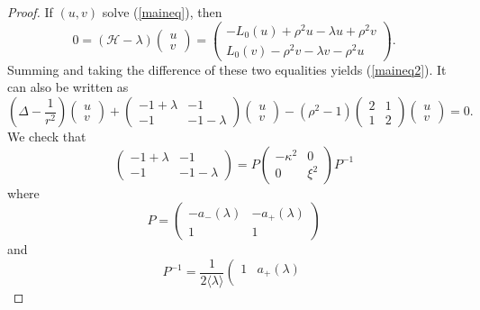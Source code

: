 \documentclass[11 pt]{amsart}
\theoremstyle{definition}
\theoremstyle{remark}
\numberwithin{equation}{section}
\begin{document}
\begin{proof}
  If $(u, v)$ solve (\ref{maineq}), then
  \[ 0 = (\mathcal{H}- \lambda) \left(\begin{array}{c}
       u\\
       v
     \end{array}\right) = \left(\begin{array}{c}
       - L_0 (u) + \rho^2 u - \lambda u + \rho^2 v\\
       L_0 (v) - \rho^2 v - \lambda v - \rho^2 u
     \end{array}\right) . \]
  Summing and taking the difference of these two equalities yields
  (\ref{maineq2}). It can also be written as
  \[ \left( \Delta - \frac{1}{r^2} \right) \left(\begin{array}{c}
       u\\
       v
     \end{array}\right) + \left(\begin{array}{cc}
       - 1 + \lambda & - 1\\
       - 1 & - 1 - \lambda
     \end{array}\right) \left(\begin{array}{c}
       u\\
       v
     \end{array}\right) - (\rho^2 - 1) \left(\begin{array}{cc}
       2 & 1\\
       1 & 2
     \end{array}\right) \left(\begin{array}{c}
       u\\
       v
     \end{array}\right) = 0. \]
  We check that
  \[ \left(\begin{array}{cc}
       - 1 + \lambda & - 1\\
       - 1 & - 1 - \lambda
     \end{array}\right) = P \left(\begin{array}{cc}
       - \kappa^2 & 0\\
       0 & \xi^2
     \end{array}\right) P^{- 1} \]
  where
  \[ P = \left(\begin{array}{cc}
       - a_- (\lambda) & - a_+ (\lambda)\\
       1 & 1
     \end{array}\right) \]
  and
  \[ P^{- 1} = \frac{1}{2 \langle \lambda \rangle} \left(\begin{array}{cc}
       1 & a_+ (\lambda)\\

\end{array}\]
\end{proof}
\end{document}
